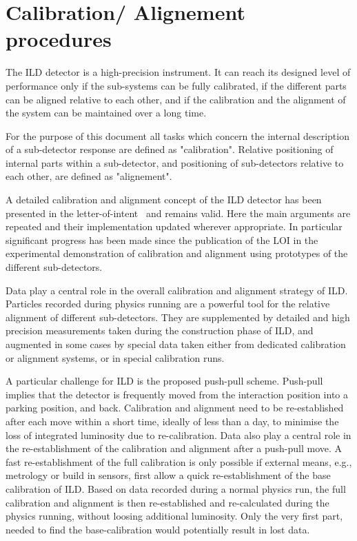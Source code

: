 \section{Calibration/ Alignement procedures}

The ILD detector is a high-precision instrument. It can reach its designed level of performance only if the sub-systems can be fully calibrated, if the different parts can be aligned relative to each other, and if the calibration and the alignment of the system can be maintained over a long time. 

For the purpose of this document all tasks which concern the internal description of a sub-detector response are defined as "calibration". Relative positioning of internal parts within a sub-detector, and positioning of sub-detectors relative to each other, are defined as "alignement". 

A detailed calibration and alignment concept of the ILD detector has been presented in the letter-of-intent~\cite{ild:bib:ILDloi} and remains valid. Here the main arguments are repeated and their implementation updated wherever appropriate. In particular significant progress has been made since the publication of the LOI in the experimental demonstration of calibration and alignment using prototypes of the different sub-detectors. 

Data play a central role in the overall calibration and alignment strategy of ILD. Particles recorded during physics running are a powerful tool for the relative alignment of different sub-detectors. They are supplemented by detailed and high precision measurements taken during the construction phase of ILD, and  augmented in some cases by special data taken either from dedicated calibration or alignment systems, or in special calibration runs. 

A particular challenge for ILD is the proposed push-pull scheme. Push-pull implies that the detector is frequently moved from the interaction position into a parking position, and back. Calibration and alignment need to be re-established after each move within a short time, ideally of less than a day, to minimise the loss of integrated luminosity due to re-calibration. 
Data also play a central role in the re-establishment of the calibration and alignment after a push-pull move. A fast re-establishment of the full calibration is only possible if external means, e.g., metrology or build in sensors, first allow a quick re-establishment of the base calibration of ILD. Based on data recorded during a normal physics run, the full calibration and alignment is then re-established and re-calculated during the physics running, without loosing additional luminosity. Only the very first part, needed to find the base-calibration would potentially result in lost data. 


